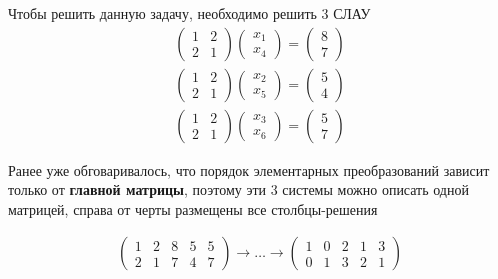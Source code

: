 \documentclass[]{article}
\begin{document}
Чтобы решить данную задачу, необходимо решить 3 СЛАУ
\begin{gather*}
\begin{pmatrix}
	1 & 2 
	\\
	2 & 1
\end{pmatrix}
\begin{pmatrix}
	x_1
	\\
	x_4
\end{pmatrix}
=
\begin{pmatrix}
	8
	\\
	7
\end{pmatrix}
\\
\begin{pmatrix}
	1 & 2 
	\\
	2 & 1
\end{pmatrix}
\begin{pmatrix}
	x_2
	\\
	x_5
\end{pmatrix}
=
\begin{pmatrix}
	5
	\\
	4
\end{pmatrix}
\\
\begin{pmatrix}
	1 & 2 
	\\
	2 & 1
\end{pmatrix}
\begin{pmatrix}
	x_3
	\\
	x_6
\end{pmatrix}
=
\begin{pmatrix}
	5
	\\
	7
\end{pmatrix}
\end{gather*}

Ранее уже обговаривалось, что порядок элементарных преобразований зависит только от \textbf{главной матрицы}, поэтому эти 3 системы можно описать одной матрицей, справа от черты размещены все столбцы-решения

\begin{gather*}
\left(
\begin{array}{ll|lll}
	1 & 2 & 8 & 5 & 5
	\\
	2 & 1 & 7 & 4 & 7
\end{array}
\right)\rightarrow
\ldots
\rightarrow
\left(
\begin{array}{ll|lll}
	1 & 0 & 2 & 1 & 3
	\\
	0 & 1 & 3 & 2 & 1
\end{array}
\right)
\end{gather*}
\end{document}
